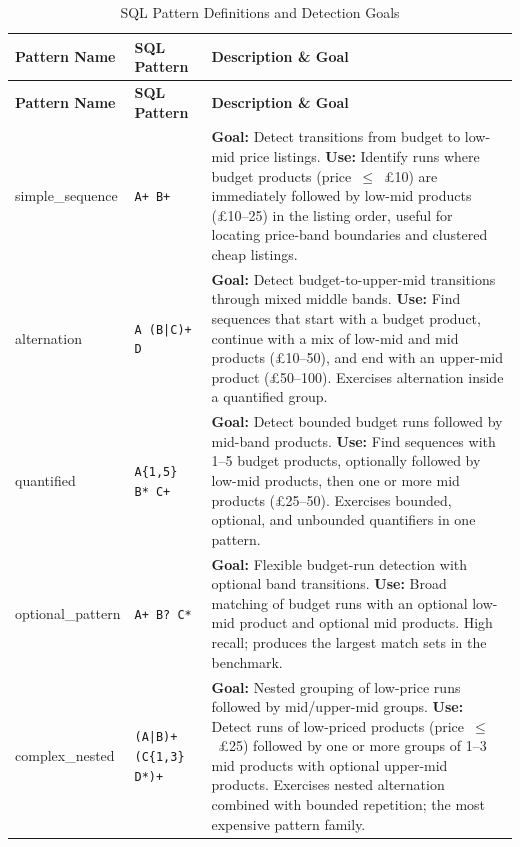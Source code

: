 {\small
\setlength{\tabcolsep}{4pt}
\begin{longtable}{llp{}}
\caption{SQL Pattern Definitions and Detection Goals}
\label{tab:pattern_definitions} \\
\toprule
\textbf{Pattern Name} & \textbf{SQL Pattern} & \textbf{Description \& Goal} \\
\midrule
\endfirsthead
\toprule
\textbf{Pattern Name} & \textbf{SQL Pattern} & \textbf{Description \& Goal} \\
\midrule
\endhead
\bottomrule
\endfoot

simple\_sequence & \texttt{A+ B+} &
\textbf{Goal:} Detect transitions from budget to low-mid price
listings.
\newline
\textbf{Use:} Identify runs where budget products
(price~$\le$~\pounds10) are immediately followed by low-mid products
(\pounds10--25) in the listing order, useful for locating price-band
boundaries and clustered cheap listings. \\
\midrule

alternation & \texttt{A (B|C)+ D} &
\textbf{Goal:} Detect budget-to-upper-mid transitions through mixed
middle bands.
\newline
\textbf{Use:} Find sequences that start with a budget product,
continue with a mix of low-mid and mid products (\pounds10--50), and
end with an upper-mid product (\pounds50--100).  Exercises
alternation inside a quantified group. \\
\midrule

quantified & \texttt{A\{1,5\} B* C+} &
\textbf{Goal:} Detect bounded budget runs followed by mid-band
products.
\newline
\textbf{Use:} Find sequences with 1--5 budget products, optionally
followed by low-mid products, then one or more mid products
(\pounds25--50).  Exercises bounded, optional, and unbounded
quantifiers in one pattern. \\
\midrule

optional\_pattern & \texttt{A+ B? C*} &
\textbf{Goal:} Flexible budget-run detection with optional band
transitions.
\newline
\textbf{Use:} Broad matching of budget runs with an optional low-mid
product and optional mid products.  High recall; produces the
largest match sets in the benchmark. \\
\midrule

complex\_nested & \texttt{(A|B)+ (C\{1,3\} D*)+} &
\textbf{Goal:} Nested grouping of low-price runs followed by
mid/upper-mid groups.
\newline
\textbf{Use:} Detect runs of low-priced products
(price~$\le$~\pounds25) followed by one or more groups of 1--3 mid
products with optional upper-mid products.  Exercises nested
alternation combined with bounded repetition; the most expensive
pattern family. \\
\end{longtable}
}

